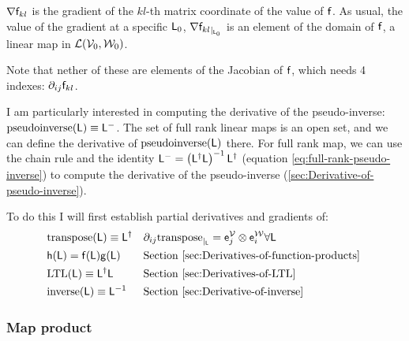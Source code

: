 ${\mathbf \nabla}{\mathsf{f}_{kl}}$ is the gradient of the $kl$-th matrix coordinate of the value of $\mathsf{f}$.
As usual, the value of the gradient at a specific $\mathsf{L}_0$,
${\mathbf \nabla}{\mathsf{f}_{kl}}_{\mid_{\mathsf{L}_0}}$ is an element of the domain of $\mathsf{f}$,
a linear map in $\mathcal{L}(\mathcal{V}_0,\mathcal{W}_0)$.

Note that nether of these are elements of the Jacobian of $\mathsf{f}$,
which needs 4 indexes: ${\partial}_{ij}{\mathsf{f}_{kl}}$.

I am particularly interested in computing the derivative of the
pseudo-inverse: $\mathrm{pseudoinverse}(\mathsf{L}) \equiv \mathsf{L}^{-}$.
The set of full rank linear maps is an open set,
and we can define the derivative of $\mathrm{pseudoinverse}(\mathsf{L})$ there.
For full rank map,
we can use the chain rule and the identity
$\mathsf{L}^{-} = \left( \mathsf{L}^{\dagger} \mathsf{L} \right)^{-1} \mathsf{L}^{\dagger}$
(equation \ref{eq:full-rank-pseudo-inverse})
to compute the derivative of the pseudo-inverse
(\autoref{sec:Derivative-of-pseudo-inverse}).

To do this I will first establish partial derivatives and gradients of:
\begin{equation}
\begin{aligned}
\label{eq:transpose-derivative}
&\mathrm{transpose}(\mathsf{L}) \equiv \mathsf{L}^{\dagger}
&&{\partial}_{ij}{\mathrm{transpose}}_{\mid_{\mathsf{L}}} =  \mathsf{e}_j^{\mathcal{V}} \otimes \mathsf{e}_i^{\mathcal{W}}
\forall \mathsf{L}
\\
&\mathsf{h}( \mathsf{L} ) = \mathsf{f} ( \mathsf{L} ) \mathsf{g} ( \mathsf{L} )
&&\text{Section \ref{sec:Derivatives-of-function-products} }
\\
&\mathrm{LTL}(\mathsf{L}) \equiv \mathsf{L}^{\dagger} \mathsf{L}
&&\text{Section \ref{sec:Derivatives-of-LTL} }
\\
&\mathrm{inverse}(\mathsf{L}) \equiv \mathsf{L}^{-1}
&&\text{Section \ref{sec:Derivative-of-inverse} }
\end{aligned}
\end{equation}


\subsubsection{Map product}
\label{sec:Derivatives-of-function-products}

